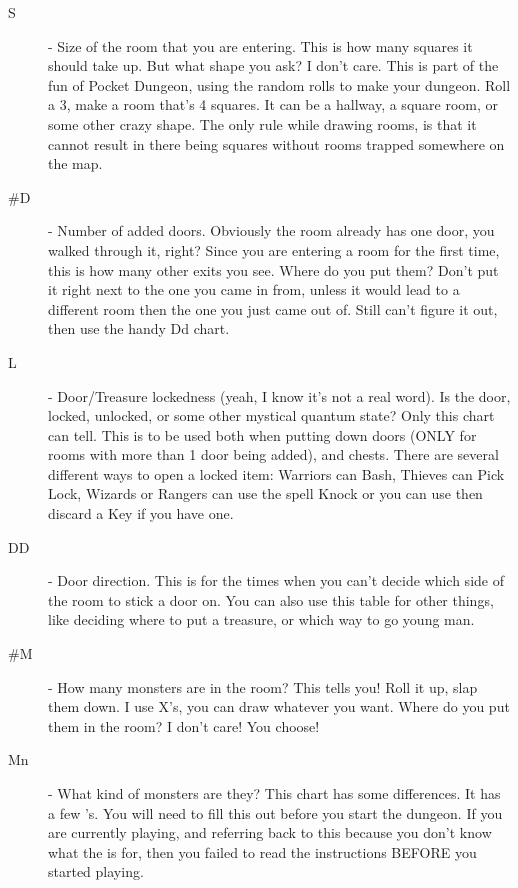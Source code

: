 \documentclass[a6paper,hidelinks]{article}
\makeatletter
\def\namedlabel#1#2{\begingroup
    #2%
    \def\@currentlabel{#2}%
    \phantomsection\label{#1}\endgroup
}
\makeatother
\begin{document}
\begin{description}
\item[\namedlabel{itm:srt_S}{S}] - Size of the room that you are entering. This is how many squares it should take up. But what shape you ask? I don't care. This is part of the fun of Pocket Dungeon, using the random rolls to make your dungeon. Roll a 3, make a room that’s 4 squares. It can be a hallway, a square room, or some other crazy shape. The only rule while drawing rooms, is that it cannot result in there being squares without rooms trapped somewhere on the map.

\item[\namedlabel{itm:srt_nD}{\#D}] - Number of added doors. Obviously the room already has one door, you walked through it, right? Since you are entering a room for the first time, this is how many other exits you see. Where do you put them? Don't put it right next to the one you came in from, unless it would lead to a different room then the one you just came out of. Still can't figure it out, then use the handy Dd chart.

\item[\namedlabel{itm:srt_L}{L}] - Door/Treasure lockedness (yeah, I know it’s not a real word). Is the door, locked, unlocked, or some other mystical quantum state? Only this chart can tell. This is to be used both when putting down doors (ONLY for rooms with more than 1 door being added), and chests. There are several different ways to open a locked item: Warriors can Bash, Thieves can Pick Lock, Wizards or Rangers can use the spell Knock or you can use then discard a Key if you have one.

\item[\namedlabel{itm:srt_DD}{DD}] - Door direction. This is for the times when you can't decide which side of the room to stick a door on. You can also use this table for other things, like deciding where to put a treasure, or which way to go young man.

\item[\namedlabel{itm:srt_nM}{\#M}] - How many monsters are in the room? This tells you! Roll it up, slap them down. I use X's, you can draw whatever you want. Where do you put them in the room? I don't care! You choose!

\item[\namedlabel{itm:srt_Mn}{Mn}] - What kind of monsters are they? This chart has some differences. It has a few \underline{\hspace*{1cm}}'s. You will need to fill this out before you start the dungeon. If you are currently playing, and referring back to this because you don't know what the \underline{\hspace*{1cm}} is for, then you failed to read the instructions BEFORE you started playing.


\end{description}
\end{document}
